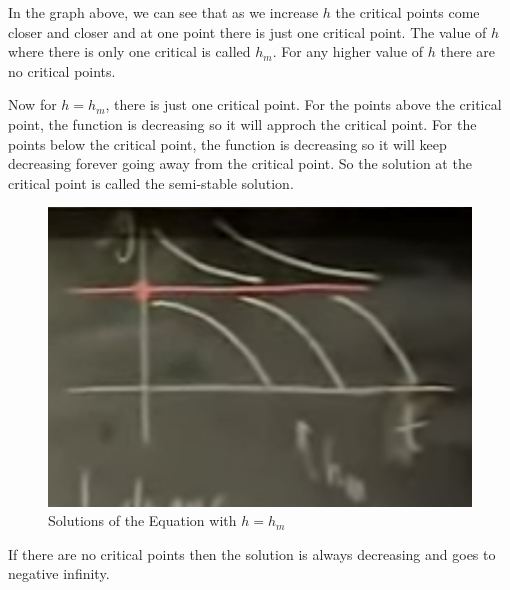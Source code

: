 In the graph above, we can see that as we increase $h$ the critical points come closer and closer and at one point there is just one critical point.
The value of $h$ where there is only one critical is called $h_m$.
For any higher value of $h$ there are no critical points.


Now for $h = h_m$, there is just one critical point. 
For the points above the critical point, the function is decreasing so it will approch the critical point.
For the points below the critical point, the function is decreasing so it will keep decreasing forever going away from the critical point.
So the solution at the critical point is called the semi-stable solution.

\begin{figure}[ht!]
    \centering
    \includegraphics[scale=0.3]{./images/lecture_5_figure_5.png}
    \caption{Solutions of the Equation with $h = h_m$}
\end{figure}

If there are no critical points then the solution is always decreasing and goes to negative infinity.